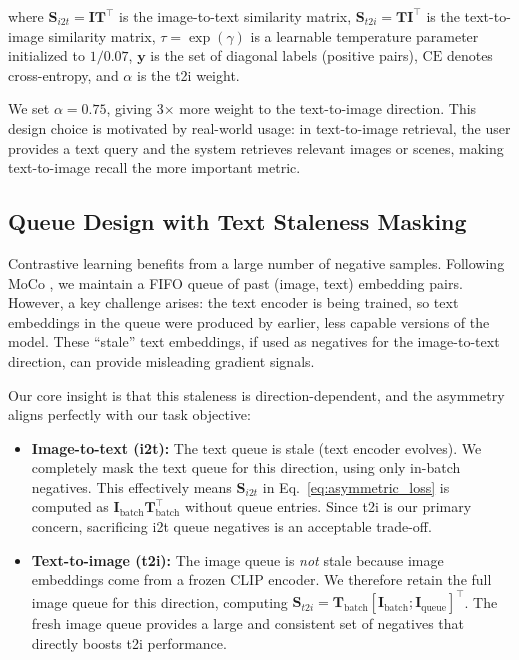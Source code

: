 \documentclass[10pt,leqno]{amsart}
\begin{document}
where $\mathbf{S}_{i2t} = \mathbf{I} \mathbf{T}^{\top}$ is the image-to-text similarity matrix, $\mathbf{S}_{t2i} = \mathbf{T} \mathbf{I}^{\top}$ is the text-to-image similarity matrix, $\tau = \exp(\gamma)$ is a learnable temperature parameter initialized to $1/0.07$, $\mathbf{y}$ is the set of diagonal labels (positive pairs), $\text{CE}$ denotes cross-entropy, and $\alpha$ is the t2i weight.

We set $\alpha = 0.75$, giving 3$\times$ more weight to the text-to-image direction. This design choice is motivated by real-world usage: in text-to-image retrieval, the user provides a text query and the system retrieves relevant images or scenes, making text-to-image recall the more important metric.

\subsection{Queue Design with Text Staleness Masking}

Contrastive learning benefits from a large number of negative samples. Following MoCo \citep{he2020moco}, we maintain a FIFO queue of past (image, text) embedding pairs. However, a key challenge arises: the text encoder is being trained, so text embeddings in the queue were produced by earlier, less capable versions of the model. These ``stale'' text embeddings, if used as negatives for the image-to-text direction, can provide misleading gradient signals.

Our core insight is that this staleness is direction-dependent, and the asymmetry aligns perfectly with our task objective:

\begin{itemize}
    \item \textbf{Image-to-text (i2t):} The text queue is stale (text encoder evolves). We completely mask the text queue for this direction, using only in-batch negatives. This effectively means $\mathbf{S}_{i2t}$ in Eq.~\ref{eq:asymmetric_loss} is computed as $\mathbf{I}_{\text{batch}} \mathbf{T}_{\text{batch}}^{\top}$ without queue entries. Since t2i is our primary concern, sacrificing i2t queue negatives is an acceptable trade-off.
    \item \textbf{Text-to-image (t2i):} The image queue is \emph{not} stale because image embeddings come from a frozen CLIP encoder. We therefore retain the full image queue for this direction, computing $\mathbf{S}_{t2i} = \mathbf{T}_{\text{batch}} [\mathbf{I}_{\text{batch}}; \mathbf{I}_{\text{queue}}]^{\top}$. The fresh image queue provides a large and consistent set of negatives that directly boosts t2i performance.
\end{itemize}
\end{document}
